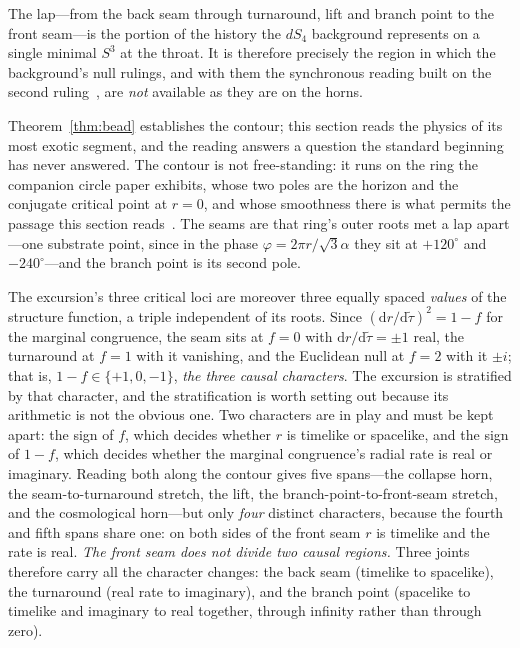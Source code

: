 \documentclass[11pt,a4paper]{article}
\theoremstyle{plain}
\theoremstyle{definition}
\theoremstyle{remark}
\newcommand{\dd}{\mathrm{d}}
\begin{document}
The lap---from the back seam through turnaround, lift and branch point to the front seam---is the
portion of the history the $dS_4$ background represents on a single minimal $S^3$ at the throat. It is
therefore precisely the region in which the background's null rulings, and with them the synchronous
reading built on the second ruling~\cite{JanzenOperator}, are \emph{not} available as they are on the
horns.

Theorem~\ref{thm:bead} establishes the contour; this section reads the physics of its most exotic segment, and
the reading answers a question the standard beginning has never answered. The contour is not free-standing: it runs on the ring the companion circle paper exhibits, whose two poles are the horizon and the conjugate critical point at $r=0$, and whose smoothness there is what permits the passage this section reads~\cite{JanzenCircle}. The seams are that ring's outer roots met a lap apart---one substrate point, since in the phase $\varphi=2\pi r/\sqrt3\alpha$ they sit at $+120^\circ$ and $-240^\circ$---and the branch point is its second pole.

The excursion's three critical loci are moreover three equally spaced \emph{values} of the structure function, a triple independent of its roots. Since $(\dd r/\dd\tilde\tau)^{2}=1-f$ for the marginal congruence, the seam sits at $f=0$ with $\dd r/\dd\tilde\tau=\pm1$ real, the turnaround at $f=1$ with it vanishing, and the Euclidean null at $f=2$ with it $\pm i$; that is, $1-f\in\{+1,0,-1\}$, \emph{the three causal characters}. The excursion is stratified by that character, and the stratification is worth setting out because its
arithmetic is not the obvious one. Two characters are in play and must be kept apart: the sign of $f$, which
decides whether $r$ is timelike or spacelike, and the sign of $1-f$, which decides whether the marginal
congruence's radial rate is real or imaginary. Reading both along the contour gives five spans---the collapse
horn, the seam-to-turnaround stretch, the lift, the branch-point-to-front-seam stretch, and the cosmological
horn---but only \emph{four} distinct characters, because the fourth and fifth spans share one: on both sides of
the front seam $r$ is timelike and the rate is real. \emph{The front seam does not divide two causal regions.}
Three joints therefore carry all the character changes: the back seam (timelike to spacelike), the turnaround
(real rate to imaginary), and the branch point (spacelike to timelike and imaginary to real together, through
infinity rather than through zero).
\end{document}
